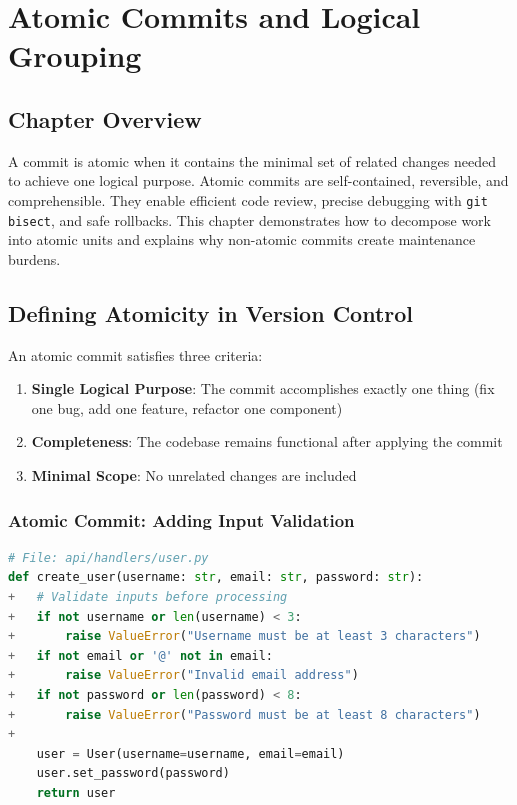 \chapter{Atomic Commits and Logical Grouping}

\section{Chapter Overview}
A commit is atomic when it contains the minimal set of related changes needed to achieve one logical purpose. Atomic commits are self-contained, reversible, and comprehensible. They enable efficient code review, precise debugging with \texttt{git bisect}, and safe rollbacks. This chapter demonstrates how to decompose work into atomic units and explains why non-atomic commits create maintenance burdens.

\section{Defining Atomicity in Version Control}

An atomic commit satisfies three criteria:

\begin{enumerate}
  \item \textbf{Single Logical Purpose}: The commit accomplishes exactly one thing (fix one bug, add one feature, refactor one component)
  \item \textbf{Completeness}: The codebase remains functional after applying the commit
  \item \textbf{Minimal Scope}: No unrelated changes are included
\end{enumerate}

\subsection{Atomic Commit: Adding Input Validation}

\begin{lstlisting}[style=code,language=Python,caption={A focused commit adding validation to one function}]
# File: api/handlers/user.py
def create_user(username: str, email: str, password: str):
+   # Validate inputs before processing
+   if not username or len(username) < 3:
+       raise ValueError("Username must be at least 3 characters")
+   if not email or '@' not in email:
+       raise ValueError("Invalid email address")
+   if not password or len(password) < 8:
+       raise ValueError("Password must be at least 8 characters")
+
    user = User(username=username, email=email)
    user.set_password(password)
    return user
\end{lstlisting}

